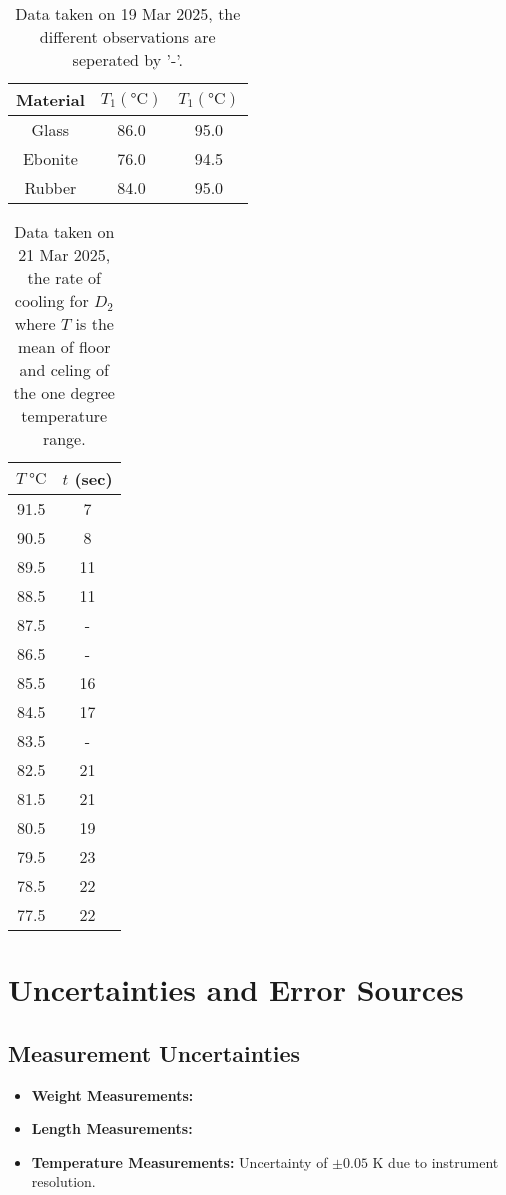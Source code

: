 \documentclass[%
 sor,
 jor,
 amsmath,amssymb,
 reprint,
]{revtex4-2}
\begin{document}
\begin{table}[h]
\centering
\begin{tabular}{|c|c|c|}
    \hline
    Material & $T_1 (\si{\celsius})$  &  $T_1 (\si{\celsius})$ \\
    \hline
    Glass	& 86.0 & 95.0\\
    Ebonite 	& 76.0& 94.5\\
    Rubber 	& 84.0& 95.0 \\
    \hline
\end{tabular}
\caption{Data taken on 19 Mar 2025, the different observations are seperated by '-'.}
\end{table}
\begin{table}[H]
\label{tab:}
\centering
  \begin{tabular}{|c|c|}
	  \hline
	  $T~\si{\celsius}$   &  $t$ (sec)\\
	  \hline
 91.5   &7 \\
	  90.5 & 8 \\
	  89.5 & 11 \\
	  88.5 & 11 \\
	  87.5 & - \\
	  86.5 & - \\
	  85.5 & 16 \\
	  84.5 & 17 \\
	  83.5 & - \\
	  82.5 & 21 \\
	  81.5 & 21 \\
	  80.5 & 19 \\
	  79.5 & 23 \\
	  78.5 & 22 \\
	  77.5 & 22 \\
	  \hline
  \end{tabular}
  \caption{Data taken on 21 Mar 2025, the rate of cooling for $D_2$ where $T$ is the mean of floor and celing of the one degree temperature range.}
\end{table}

\section{Uncertainties and Error Sources}
\subsection{Measurement Uncertainties}
\begin{itemize}
	\item \textbf{Weight Measurements:}
    \item \textbf{Length Measurements:} 
    \item \textbf{Temperature Measurements:} Uncertainty of $\pm 0.05$ \si{\kelvin} due to instrument resolution.
\end{itemize}
\end{document}
